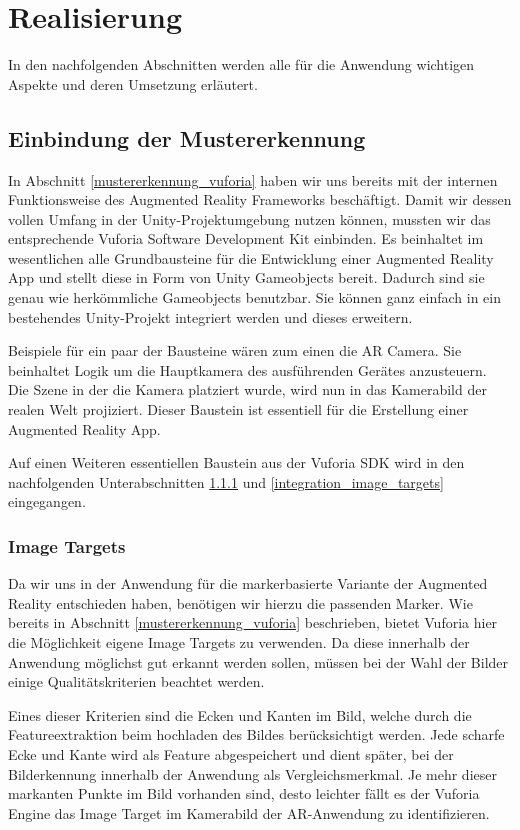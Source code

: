 \chapter{Realisierung}\label{ch:realisierung_der_anwendung}
In den nachfolgenden Abschnitten werden alle für die Anwendung wichtigen Aspekte und deren Umsetzung erläutert. 

\section{Einbindung der Mustererkennung}\label{einbindung_mustererkennung}
In Abschnitt \ref{mustererkennung_vuforia} haben wir uns bereits mit der internen Funktionsweise des Augmented Reality Frameworks  beschäftigt. 
Damit wir dessen vollen Umfang in der Unity-Projektumgebung nutzen können, mussten wir das entsprechende Vuforia Software Development Kit einbinden.
Es beinhaltet im wesentlichen alle Grundbausteine für die Entwicklung einer Augmented Reality App und stellt diese in Form von Unity Gameobjects bereit. 
Dadurch sind sie genau wie herkömmliche Gameobjects benutzbar. 
Sie können ganz einfach in ein bestehendes Unity-Projekt integriert werden und dieses erweitern.

Beispiele für ein paar der Bausteine wären zum einen die AR Camera. 
Sie beinhaltet Logik um die Hauptkamera des ausführenden Gerätes anzusteuern. Die Szene in der die Kamera platziert wurde, wird nun in das Kamerabild der realen Welt projiziert.
Dieser Baustein ist essentiell für die Erstellung einer Augmented Reality App. 

Auf einen Weiteren essentiellen Baustein aus der Vuforia SDK wird in den nachfolgenden Unterabschnitten \ref{image_targets} und \ref{integration_image_targets} eingegangen. 

\subsection{Image Targets}\label{image_targets}
Da wir uns in der Anwendung für die markerbasierte Variante der Augmented Reality entschieden haben, benötigen wir hierzu die passenden Marker. 
Wie bereits in Abschnitt \ref{mustererkennung_vuforia} beschrieben, bietet Vuforia hier die Möglichkeit eigene Image Targets zu verwenden. 
Da diese innerhalb der Anwendung möglichst gut erkannt werden sollen, müssen bei der Wahl der Bilder einige Qualitätskriterien beachtet werden.

Eines dieser Kriterien sind die Ecken und Kanten im Bild, welche durch die Featureextraktion beim hochladen des Bildes berücksichtigt werden. 
Jede scharfe Ecke und Kante wird als Feature abgespeichert und dient später, bei der Bilderkennung innerhalb der Anwendung als Vergleichsmerkmal. 
Je mehr dieser markanten Punkte im Bild vorhanden sind, desto leichter fällt es der Vuforia Engine das Image Target im Kamerabild der AR-Anwendung zu identifizieren.


